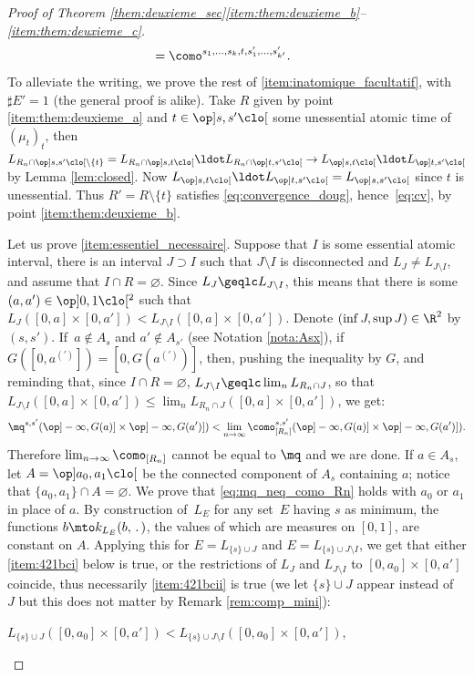 \begin{proof}[Proof of Theorem \ref{them:deuxieme_sec}\eqref{item:them:deuxieme_b}--\eqref{item:them:deuxieme_c}]
\begin{align*}
&\hspace*{-5mm}=\como^{s_1,\ldots,s_k,t,s'_1,\ldots,s'_{k'}}.
\end{align*}
To alleviate the writing, we prove the rest of \eqref{item:inatomique_facultatif}, with $\sharp E'=1$ (the general proof is alike). Take $R$ given by point \eqref{item:them:deuxieme_a} and $t\in\op]s,s'\clo[$ some unessential atomic time of $(\mu_t)_t$, then $L_{R_n\cap \op]s,s'\clo[\setminus\{t\}}=L_{R_n\cap \op]s,t\clo[}{}\ldot L_{R_n\cap \op]t,s'\clo[}\to L_{\op]s,t\clo[}{}\ldot L_{\op]t,s'\clo[}$ by Lemma \ref{lem:closed}. Now $L_{\op]s,t\clo[}{}\ldot L_{\op]t,s'\clo[}=L_{\op]s,s'\clo[}$ since $t$ is unessential. Thus $R'=R\setminus\{t\}$ satisfies \eqref{eq:convergence_doug}, hence~\eqref{eq:cv}, by point \eqref{item:them:deuxieme_b}.

Let us prove \eqref{item:essentiel_necessaire}. Suppose that $I$ is some essential atomic interval, \ie there is an interval $J\supset I$ such that $J\setminus I$ is disconnected and $L_{J} \neq L_{J\setminus I}$, and assume that $I\cap R=\varnothing$. Since $L_{J} \geqlc L_{J\setminus I}$, this means that there is some $(a,a')\in\op]0,1\clo[^2$ such that $L_{J}([0,a]\times[0,a'])< L_{J\setminus I}([0,a]\times[0,a'])$. Denote $(\inf J,\sup J)\in\R^2$ by $(s,s')$. If~$a\not\in A_{s}$ and $a'\not\in A_{s'}$ (see Notation \ref{nota:Asx}), \ie if $G([0,a^{(\prime)}])=[0,G(a^{(\prime)})]$, then, pushing the inequality by $G$, and reminding that, since $I\cap R=\varnothing$, $L_{J\setminus I}\geqlc \lim_n L_{R_n\cap J}$, so that $L_{J\setminus I}([0,a]\times[0,a'])\leqslant \lim_n L_{R_n\cap J}([0,a]\times[0,a'])$, we get:\vspace*{-2pt}
\begin{equation}\label{eq:mq_neq_como_Rn}
\mq^{s,s'}(\op]-\infty,G(a)]\times\op]-\infty,G(a')])< \lim_{n\to\infty}\como_{[R_n]}^{s,s'}(\op]-\infty,G(a)]\times\op]-\infty,G(a')]).
\end{equation}
Therefore $ \lim_{n\to\infty}\como_{[R_n]}$ cannot be equal to $\mq$ and we are done. If $a\in A_s$, let $A=\op]a_0,a_1\clo[$ be the connected component of $A_s$ containing $a$; notice that $\{a_0,a_1\}\cap A=\varnothing$. We prove that \eqref{eq:mq_neq_como_Rn} holds with $a_0$ or $a_1$ in place of $a$. By construction of~$L_E$ for any set~$E$ having $s$ as minimum, the functions $b\mto k_{L_E}(b,\,.\,)$, the values of which are measures on $[0,1]$, are constant on $A$. Applying this for $E=L_{\{s\}\cup J}$ and $E=L_{\{s\}\cup J\setminus I}$, we get that either \eqref{item:421bci} below is true, or the restrictions of $L_{ J}$ and $L_{ J\setminus I}$ to $[0,a_0]\times[0,a']$ coincide, thus necessarily \eqref{item:421bcii} is true (we let $\{s\}\cup J$ appear instead of~$J$ but this does not matter by Remark \ref{rem:comp_mini}):
\begin{enumeratei}
\item\label{item:421bci}
$L_{\{s\}\cup J}([0,a_0]\times[0,a'])< L_{\{s\}\cup J\setminus I}([0,a_0]\times[0,a'])$,


\end{enumeratei}
\end{proof}

